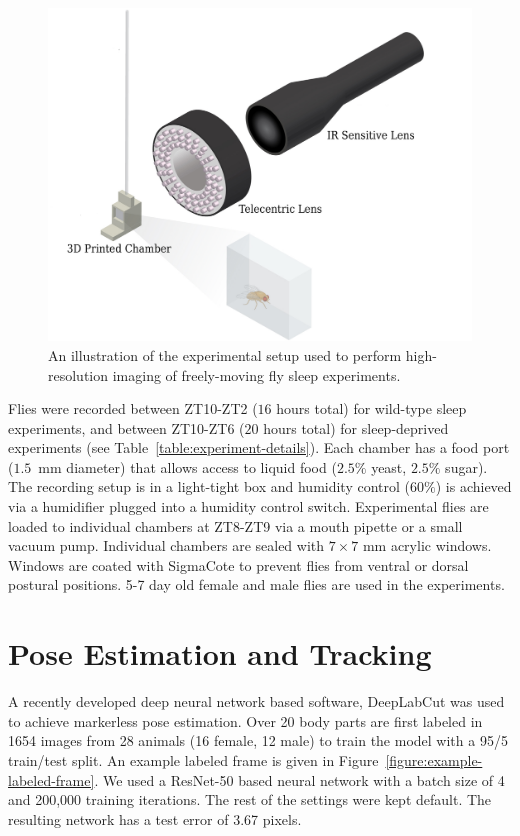 \begin{figure}[htb!]
	\centering
	\includegraphics[width=0.995\linewidth]{figures/ExperimentalSetup.pdf}
	\caption[An illustration of the experimental setup used to perform high-resolution imaging of experiments.]{An illustration of the experimental setup used to perform high-resolution imaging of freely-moving fly sleep experiments. \label{figure:experiment-setup}}
\end{figure}

Flies were recorded between ZT10-ZT2 ($16$ hours total) for wild-type sleep experiments, and between ZT10-ZT6 ($20$ hours total) for sleep-deprived experiments (see Table~\ref{table:experiment-details}).
Each chamber has a food port ($1.5$ mm diameter) that allows access to liquid food ($2.5\%$ yeast, $2.5\%$ sugar).
The recording setup is in a light-tight box and humidity control ($60\%$) is achieved via a humidifier plugged into a humidity control switch.
Experimental flies are loaded to individual chambers at ZT8-ZT9 via a mouth pipette or a small vacuum pump.
Individual chambers are sealed with $7\times7$ mm acrylic windows.
Windows are coated with SigmaCote to prevent flies from ventral or dorsal postural positions.
5-7 day old female and male flies are used in the experiments.

\section{Pose Estimation and Tracking}
A recently developed deep neural network based software, DeepLabCut \citep{mathis_deeplabcut_2018} was used to achieve markerless pose estimation.
Over 20 body parts are first labeled in 1654 images from 28 animals (16 female, 12 male) to train the model with a 95/5 train/test split.
An example labeled frame is given in Figure~\ref{figure:example-labeled-frame}.
We used a ResNet-50 \citep{he_deep_2016} based neural network with a batch size of 4 and 200,000 training iterations.
The rest of the settings were kept default.
The resulting network has a test error of 3.67 pixels.

